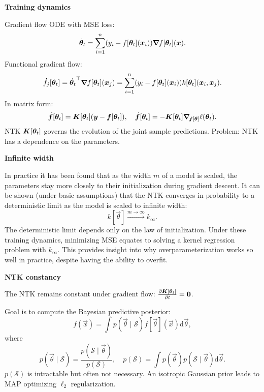 \documentclass[10pt]{article}
\newenvironment{topic}[1]
{\textbf{\sffamily \colorbox{black}{\rlap{\textbf{\textcolor{white}{#1}}}\hspace{\linewidth}\hspace{-2\fboxsep}}}}
{}
\newenvironment{subtopic}[1]
{\begin{center}\textbf{\sffamily #1}\end{center}}
{}
\begin{document}
\begin{multicols*}{3}
\begin{topic}{Neural tangent kernel}
        \begin{subtopic}{Training dynamics}
            Gradient flow ODE with MSE loss: \[
                \dot{\vec{\theta}}_t = \sum_{i=1}^{n} (y_i - f[\vec{\theta}_t](\vec{x}_i)) \grad{f[\vec{\theta}_t](\vec{x})}{}.
            \]
            Functional gradient flow: \[
                \dot{f}_j[\vec{\theta}_t] = \transpose{\dot{\vec{\theta}_t}} \grad{f[\vec{\theta}_t](\vec{x}_j)}{} = \sum_{i=1}^{n} (y_i - f[\vec{\theta}_t](\vec{x}_i)) k[\vec{\theta}_t](\vec{x}_i, \vec{x}_j).
            \]
            In matrix form: \[
                \dot{\vec{f}}[\vec{\theta}_t] = \mat{K}[\vec{\theta}_t](\vec{y} - \vec{f}[\vec{\theta}_t]), \quad \dot{\vec{f}}[\vec{\theta}_t] = -\mat{K}[\vec{\theta}_t] \grad{\ell(\vec{\theta}_t)}{\vec{f}[\vec{\theta}]}.
            \]
            NTK $\mat{K}[\vec{\theta}_t]$ governs the evolution of the joint sample predictions. Problem: NTK
            has a dependence on the parameters.
        \end{subtopic}

        \begin{subtopic}{Infinite width}
            In practice it has been found that as the width $m$ of a model is scaled, the parameters stay
            more closely to their initialization during gradient descent. It can be shown (under
            basic assumptions) that the NTK converges in probability to a deterministic limit as the
            model is scaled to infinite width: \[
                k[\vec{\theta}] \xrightarrow{m \to \infty} k_{\infty}.
            \]
            The deterministic limit depends only on the law of initialization. Under these training dynamics,
            minimizing MSE equates to solving a kernel regression problem with $k_{\infty}$. This provides
            insight into why overparameterization works so well in practice, despite having the ability to
            overfit.
        \end{subtopic}

        \begin{subtopic}{NTK constancy}
            The NTK remains constant under gradient flow: $\pdv{\mat{K}[\vec{\theta}_t]}{t} = \vec{0}$.
        \end{subtopic}

    \end{topic}

    \begin{topic}{Bayesian learning}
        Goal is to compute the Bayesian predictive posterior: \[
            f(\vec{x}) = \int p(\vec{\theta} \mid \mathcal{S}) f[\vec{\theta}](\vec{x}) \mathrm{d}\vec{\theta},
        \]
        where \[
            p(\vec{\theta} \mid \mathcal{S}) = \frac{p(\mathcal{S} \mid \vec{\theta})}{p(\mathcal{S})}, \quad p(\mathcal{S}) = \int p(\vec{\theta}) p(\mathcal{S} \mid \vec{\theta}) \mathrm{d}\vec{\theta}.
        \]
        $p(\mathcal{S})$ is intractable but often not necessary. An isotropic Gaussian prior leads to MAP optimizing $\ell_2$ regularization.


\end{topic}
\end{multicols*}
\end{document}
